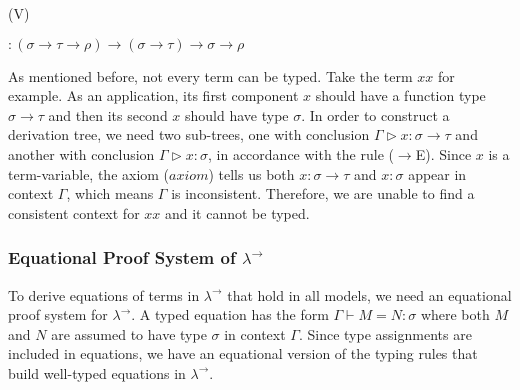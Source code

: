 \begin{myitemize}
\begin{prooftree}
\end{prooftree}
\begin{prooftree}
(V)
\end{prooftree}
\begin{prooftree}
\end{prooftree}
\begin{flushright}
$ : ( \sigma \to \tau \to \rho ) \to ( \sigma \to \tau ) \to \sigma \to \rho $
\end{flushright}
\end{myitemize}

As mentioned before, not every term can be typed. Take the term $ x x $ for example. As an application, its first component $ x $ should have a function type $ \sigma \to \tau $ and then its second $ x $ should have type $ \sigma $. In order to construct a derivation tree, we need two sub-trees, one with conclusion $ \Gamma \triangleright x: \sigma \to \tau $ and another with conclusion $ \Gamma \triangleright x : \sigma $, in accordance with the rule ($ \to $E). Since $ x $ is a term-variable, the axiom ($ axiom $) tells us both $ x : \sigma \to \tau $ and $ x: \sigma $ appear in context $ \Gamma $, which means $ \Gamma $ is inconsistent. Therefore, we are unable to find a consistent context for $ x x $ and it cannot be typed.


\subsubsection{Equational Proof System of $ \lambda ^\to $}
\label{sec:bg_lc_eps}
To derive equations of terms in $ \lambda ^\to $ that hold in all models, we need an equational proof system for $ \lambda ^\to $. A typed equation has the form $ \Gamma \vdash M=N:\sigma $ where both $ M $ and $ N $ are assumed to have type $ \sigma $ in context $ \Gamma $. Since type assignments are included in equations, we have an equational version of the typing rules that build well-typed equations in $ \lambda ^\to $.

